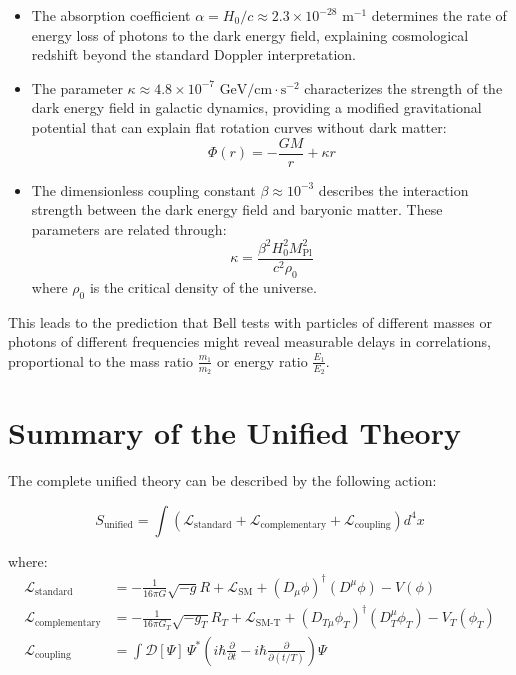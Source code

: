 \documentclass{article}
\begin{document}
	\begin{itemize}
		\item The absorption coefficient \(\alpha = H_0/c \approx 2.3 \times 10^{-28} \text{ m}^{-1}\) determines the rate of energy loss of photons to the dark energy field, explaining cosmological redshift beyond the standard Doppler interpretation.
		
		\item The parameter \(\kappa \approx 4.8 \times 10^{-7} \text{ GeV/cm}\cdot\text{s}^{-2}\) characterizes the strength of the dark energy field in galactic dynamics, providing a modified gravitational potential that can explain flat rotation curves without dark matter:
		\[
		\Phi(r) = -\frac{GM}{r} + \kappa r
		\]
		
		\item The dimensionless coupling constant \(\beta \approx 10^{-3}\) describes the interaction strength between the dark energy field and baryonic matter. These parameters are related through:
		\[
		\kappa = \frac{\beta^2 H_0^2 M_{\text{Pl}}^2}{c^2 \rho_0}
		\]
		where \(\rho_0\) is the critical density of the universe.
	\end{itemize}
	
	This leads to the prediction that Bell tests with particles of different masses or photons of different frequencies might reveal measurable delays in correlations, proportional to the mass ratio \(\frac{m_1}{m_2}\) or energy ratio \(\frac{E_1}{E_2}\).
	
	\section{Summary of the Unified Theory}
	
	The complete unified theory can be described by the following action:
	
	\begin{equation}
		S_\text{unified} = \int \left( \mathcal{L}_\text{standard} + \mathcal{L}_\text{complementary} + \mathcal{L}_\text{coupling} \right) d^4x
	\end{equation}
	
	where:
	\begin{align}
		\mathcal{L}_\text{standard} &= -\frac{1}{16\pi G} \sqrt{-g} R + \mathcal{L}_\text{SM} + (D_\mu \phi)^\dagger (D^\mu \phi) - V(\phi) \\
		\mathcal{L}_\text{complementary} &= -\frac{1}{16\pi G_T} \sqrt{-g_T} R_T + \mathcal{L}_\text{SM-T} + (D_{T\mu} \phi_T)^\dagger (D_T^\mu \phi_T) - V_T(\phi_T) \\
		\mathcal{L}_\text{coupling} &= \int \mathcal{D}[\Psi] \, \Psi^* \left( i\hbar \frac{\partial}{\partial t} - i\hbar \frac{\partial}{\partial (t/T)} \right) \Psi
	\end{align}
	
\end{document}
